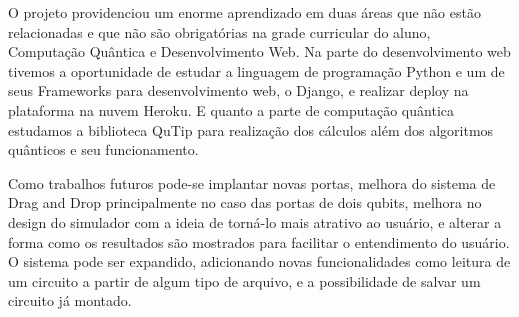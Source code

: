 \documentclass[a4paper, 12pt, oneside]{book}
\begin{document}
O projeto providenciou um enorme aprendizado em duas áreas que não estão relacionadas e que não são obrigatórias na grade curricular do aluno, Computação Quântica e Desenvolvimento Web. Na parte do desenvolvimento web tivemos a oportunidade de estudar a linguagem de programação Python e um de seus Frameworks para desenvolvimento web, o Django, e realizar deploy na plataforma na nuvem Heroku. E quanto a parte de computação quântica estudamos a biblioteca QuTip para realização dos cálculos além dos algoritmos quânticos e seu funcionamento. 

Como trabalhos futuros pode-se implantar novas portas, melhora do sistema de Drag and Drop principalmente no caso das portas de dois qubits, melhora no design do simulador com a ideia de torná-lo mais atrativo ao usuário, e alterar a forma como os resultados são mostrados para facilitar o entendimento do usuário. O sistema pode ser expandido, adicionando novas funcionalidades como leitura de um circuito a partir de algum tipo de arquivo, e a possibilidade de salvar um circuito já montado.



\end{document}

